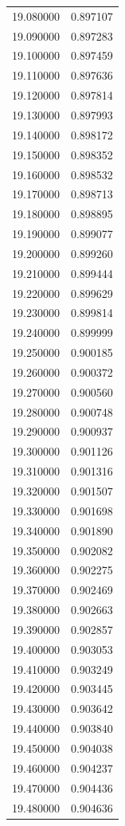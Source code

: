 \begin{tabular}{rr}
19.080000 & 0.897107 \\
19.090000 & 0.897283 \\
19.100000 & 0.897459 \\
19.110000 & 0.897636 \\
19.120000 & 0.897814 \\
19.130000 & 0.897993 \\
19.140000 & 0.898172 \\
19.150000 & 0.898352 \\
19.160000 & 0.898532 \\
19.170000 & 0.898713 \\
19.180000 & 0.898895 \\
19.190000 & 0.899077 \\
19.200000 & 0.899260 \\
19.210000 & 0.899444 \\
19.220000 & 0.899629 \\
19.230000 & 0.899814 \\
19.240000 & 0.899999 \\
19.250000 & 0.900185 \\
19.260000 & 0.900372 \\
19.270000 & 0.900560 \\
19.280000 & 0.900748 \\
19.290000 & 0.900937 \\
19.300000 & 0.901126 \\
19.310000 & 0.901316 \\
19.320000 & 0.901507 \\
19.330000 & 0.901698 \\
19.340000 & 0.901890 \\
19.350000 & 0.902082 \\
19.360000 & 0.902275 \\
19.370000 & 0.902469 \\
19.380000 & 0.902663 \\
19.390000 & 0.902857 \\
19.400000 & 0.903053 \\
19.410000 & 0.903249 \\
19.420000 & 0.903445 \\
19.430000 & 0.903642 \\
19.440000 & 0.903840 \\
19.450000 & 0.904038 \\
19.460000 & 0.904237 \\
19.470000 & 0.904436 \\
19.480000 & 0.904636 \\

\end{tabular}
